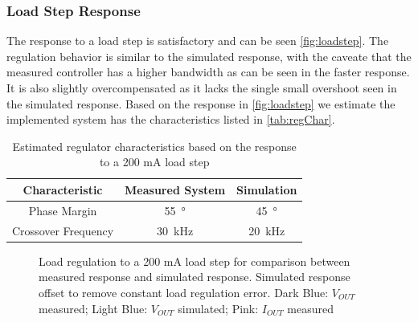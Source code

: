 \subsubsection{Load Step Response}
The response to a load step is satisfactory and can be seen \autoref{fig:loadstep}. The regulation behavior is similar to the simulated response, with the caveate that the measured controller has a higher bandwidth as can be seen in the faster response. It is also slightly overcompensated as it lacks the single small overshoot seen in the simulated response. Based on the response in \autoref{fig:loadstep} we estimate the implemented system has the characteristics listed in \autoref{tab:regChar}.

\begin{table}[H]
    \centering
    \begin{tabular}{|c|c|c|}
        Characteristic & Measured System & Simulation \\
        \hline
         Phase Margin  & \qty{55}{\degree} & \qty{45}{\degree}\\
		 Crossover Frequency & \qty{30}{\kilo\hertz} & \qty{20}{\kilo\hertz}  \\
    \end{tabular}
    \caption{Estimated regulator characteristics based on the response to a 200 mA load step}
    \label{tab:regChar}
\end{table}

\begin{figure}[ht]
	\centering
	
	\caption{Load regulation to a 200 mA load step for comparison between measured response and simulated response. Simulated response offset to remove constant load regulation error. Dark Blue: $V_{OUT}$ measured; Light Blue: $V_{OUT}$ simulated; Pink: $I_{OUT}$ measured}
	\label{fig:loadstep}
\end{figure}
\clearpage

